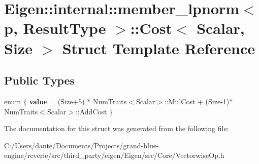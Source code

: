 \hypertarget{struct_eigen_1_1internal_1_1member__lpnorm_1_1_cost}{}\section{Eigen\+::internal\+::member\+\_\+lpnorm$<$ p, Result\+Type $>$\+::Cost$<$ Scalar, Size $>$ Struct Template Reference}
\label{struct_eigen_1_1internal_1_1member__lpnorm_1_1_cost}
\subsection*{Public Types}
\begin{DoxyCompactItemize}
\item 
\mbox{\label{struct_eigen_1_1internal_1_1member__lpnorm_1_1_cost_ab8636f7c3fc8d46af9659243f031de5f}} 
enum \{ {\bfseries value} = (Size+5) $\ast$ Num\+Traits$<$Scalar$>$\+::Mul\+Cost + (Size-\/1)$\ast$\+Num\+Traits$<$Scalar$>$\+::Add\+Cost
 \}
\end{DoxyCompactItemize}


The documentation for this struct was generated from the following file\+:\begin{DoxyCompactItemize}
\item 
C\+:/\+Users/dante/\+Documents/\+Projects/grand-\/blue-\/engine/reverie/src/third\+\_\+party/eigen/\+Eigen/src/\+Core/Vectorwise\+Op.\+h\end{DoxyCompactItemize}
